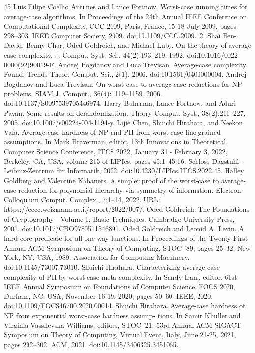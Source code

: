 \documentclass[10pt,a4paper]{article}
\begin{document}
\begin{thebibliography}{45}
 Luis Filipe Coelho Antunes and Lance Fortnow. Worst-case running times for average-case algorithms. In Proceedings of the 24th Annual IEEE Conference on Computational Complexity, CCC 2009, Paris, France, 15-18 July 2009, pages 298–303. IEEE Computer Society, 2009. doi:10.1109/CCC.2009.12.
 Shai Ben-David, Benny Chor, Oded Goldreich, and Michael Luby. On the theory of average case complexity. J. Comput. Syst. Sci., 44(2):193–219, 1992. doi:10.1016/0022-0000(92)90019-F.
 Andrej Bogdanov and Luca Trevisan. Average-case complexity. Found. Trends Theor. Comput. Sci., 2(1), 2006. doi:10.1561/0400000004.
 Andrej Bogdanov and Luca Trevisan. On worst-case to average-case reductions for NP problems. SIAM J. Comput., 36(4):1119–1159, 2006. doi:10.1137/S0097539705446974.
 Harry Buhrman, Lance Fortnow, and Aduri Pavan. Some results on derandomization. Theory Comput. Syst., 38(2):211–227, 2005. doi:10.1007/s00224-004-1194-y.
 Lijie Chen, Shuichi Hirahara, and Neekon Vafa. Average-case hardness of NP and PH from worst-case fine-grained assumptions. In Mark Braverman, editor, 13th Innovations in Theoretical Computer Science Conference, ITCS 2022, January 31 - February 3, 2022, Berkeley, CA, USA, volume 215 of LIPIcs, pages 45:1–45:16. Schloss Dagstuhl - Leibniz-Zentrum für Informatik, 2022. doi:10.4230/LIPIcs.ITCS.2022.45.
 Halley Goldberg and Valentine Kabanets. A simpler proof of the worst-case to average-case reduction for polynomial hierarchy via symmetry of information. Electron. Colloquium Comput. Complex., 7:1–14, 2022. URL: https://eccc.weizmann.ac.il/report/2022/007/.
 Oded Goldreich. The Foundations of Cryptography - Volume 1: Basic Techniques. Cambridge University Press, 2001. doi:10.1017/CBO9780511546891.
 Oded Goldreich and Leonid A. Levin. A hard-core predicate for all one-way functions. In Proceedings of the Twenty-First Annual ACM Symposium on Theory of Computing, STOC ’89, pages 25–32, New York, NY, USA, 1989. Association for Computing Machinery. doi:10.1145/73007.73010.
 Shuichi Hirahara. Characterizing average-case complexity of PH by worst-case meta-complexity. In Sandy Irani, editor, 61st IEEE Annual Symposium on Foundations of Computer Science, FOCS 2020, Durham, NC, USA, November 16-19, 2020, pages 50–60. IEEE, 2020. doi:10.1109/FOCS46700.2020.00014.
 Shuichi Hirahara. Average-case hardness of NP from exponential worst-case hardness assump- tions. In Samir Khuller and Virginia Vassilevska Williams, editors, STOC ’21: 53rd Annual ACM SIGACT Symposium on Theory of Computing, Virtual Event, Italy, June 21-25, 2021, pages 292–302. ACM, 2021. doi:10.1145/3406325.3451065.

\end{thebibliography}
\end{document}
